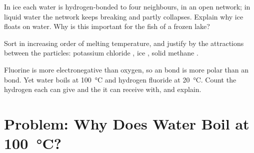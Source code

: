 \begin{exercise}[$\star\star\star$]\label{exo:g11:polarity-and-cohesion:13}
In ice each water  is hydrogen-bonded to four neighbours, in an
open network; in liquid water the network keeps breaking and partly
collapses. Explain why ice floats on water. Why is this important for
the fish of a frozen lake?
\end{exercise}

\begin{exercise}[$\star\star\star$]\label{exo:g11:polarity-and-cohesion:14}
Sort in increasing order of melting temperature, and justify by the
attractions between the particles: potassium chloride , ice
, solid methane .
\end{exercise}

\begin{exercise}[$\star\star\star$]\label{exo:g11:polarity-and-cohesion:15}
Fluorine is more electronegative than oxygen, so an  bond is
more polar than an  bond. Yet water boils at \qty{100}{\celsius}
and hydrogen fluoride at \qty{20}{\celsius}. Count the hydrogen 
each  can give and the  it can receive with, and
explain.
\end{exercise}

\section{Problem: Why Does Water Boil at \texorpdfstring{\qty{100}{\celsius}}{100 degrees Celsius}?}

